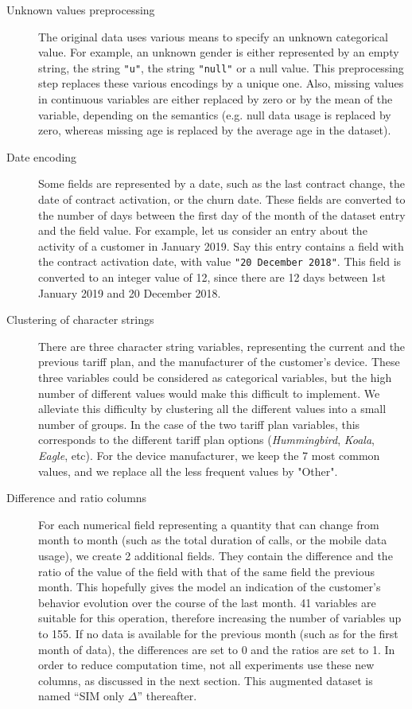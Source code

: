 \begin{description}

	\item[Unknown values preprocessing] The original data uses various means to
	specify an unknown categorical value. For example, an unknown gender is
	either represented by an empty string, the string \texttt{"u"}, the string
	\texttt{"null"} or a null value. This preprocessing step replaces these
	various encodings by a unique one. Also, missing values in continuous
	variables are either replaced by zero or by the mean of the variable,
	depending on the semantics (e.g. null data usage is replaced by zero,
	whereas missing age is replaced by the average age in the dataset).

	\item[Date encoding] Some fields are represented by a date, such as the last
	contract change, the date of contract activation, or the churn date. These
	fields are converted to the number of days between the first day of the
	month of the dataset entry and the field value. For example, let us consider
	an entry about the activity of a customer in January 2019. Say this entry
	contains a field with the contract activation date, with value \texttt{"20
	December 2018"}. This field is converted to an integer value of 12,
	since there are 12 days between 1st January 2019 and 20 December 2018.

    \item[Clustering of character strings] There are three character string
    variables, representing the current and the previous tariff plan, and the
    manufacturer of the customer's device. These three variables could be
    considered as categorical variables, but the high number of different values
    would make this difficult to implement. We alleviate this difficulty by
    clustering all the different values into a small number of groups. In the
    case of the two tariff plan variables, this corresponds to the different
    tariff plan options (\emph{Hummingbird}, \emph{Koala}, \emph{Eagle}, etc).
    For the device manufacturer, we keep the 7 most common values, and we
    replace all the less frequent values by "Other".

	\item[Difference and ratio columns] For each numerical field representing a
	quantity that can change from month to month (such as the total duration of
	calls, or the mobile data usage), we create 2 additional fields. They
	contain the difference and the ratio of the value of the field with that of
	the same field the previous month. This hopefully gives the model an
	indication of the customer's behavior evolution over the course of the last
	month. 41 variables are suitable for this operation, therefore increasing
	the number of variables up to 155. If no data is available for the previous
	month (such as for the first month of data), the differences are set to 0
	and the ratios are set to 1. In order to reduce computation time, not all
	experiments use these new columns, as discussed in the next section. This
    augmented dataset is named ``SIM only $\Delta$'' thereafter.


\end{description}
